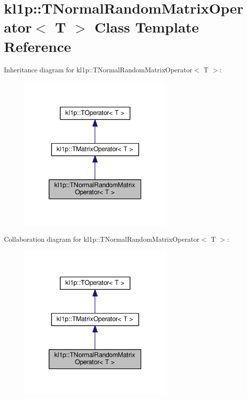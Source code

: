 \hypertarget{classkl1p_1_1TNormalRandomMatrixOperator}{}\section{kl1p\+:\+:T\+Normal\+Random\+Matrix\+Operator$<$ T $>$ Class Template Reference}
\label{classkl1p_1_1TNormalRandomMatrixOperator}


Inheritance diagram for kl1p\+:\+:T\+Normal\+Random\+Matrix\+Operator$<$ T $>$\+:
\nopagebreak
\begin{figure}[H]
\begin{center}
\leavevmode
\includegraphics[width=222pt]{classkl1p_1_1TNormalRandomMatrixOperator__inherit__graph}
\end{center}
\end{figure}


Collaboration diagram for kl1p\+:\+:T\+Normal\+Random\+Matrix\+Operator$<$ T $>$\+:
\nopagebreak
\begin{figure}[H]
\begin{center}
\leavevmode
\includegraphics[width=222pt]{classkl1p_1_1TNormalRandomMatrixOperator__coll__graph}
\end{center}
\end{figure}
